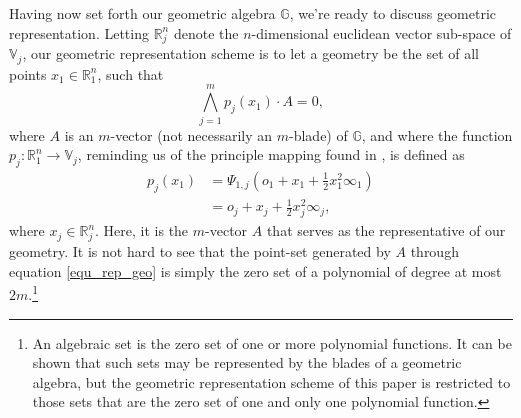 \documentclass{ecgd-l}
\theoremstyle{definition}
\theoremstyle{remark}
\numberwithin{equation}{section}
\newcommand{\G}{\mathbb{G}}
\newcommand{\V}{\mathbb{V}}
\newcommand{\R}{\mathbb{R}}
\newcommand{\nvai}{\infty}
\newcommand{\nvao}{o}
\begin{document}
Having now set forth our geometric algebra $\G$, we're ready to discuss
geometric representation.
Letting $\R^n_j$ denote the $n$-dimensional euclidean vector sub-space
of $\V_j$, our geometric representation scheme is to let a geometry be the
set of all points $x_1\in\R^n_1$, such that
\begin{equation}\label{equ_rep_geo}
\bigwedge_{j=1}^m p_j(x_1)\cdot A=0,
\end{equation}
where $A$ is an $m$-vector (not necessarily an $m$-blade) of $\G$, and
where the function $p_j:\R^n_1\to\V_j$, reminding us of the principle  mapping found in \cite{Hestenes01}, is defined as
\begin{align*}
p_j(x_1)&=\Psi_{1,j}\left(\nvao_1+x_1+\frac{1}{2}x_1^2\nvai_1\right) \\
 &= \nvao_j + x_j + \frac{1}{2}x_j^2\nvai_j,
\end{align*}
where $x_j\in\R^n_j$.
Here, it is the $m$-vector $A$ that serves as the representative of our geometry.
It is not hard to see that the point-set generated by $A$ through equation \eqref{equ_rep_geo}
is simply the zero set of a polynomial of degree at most $2m$.\footnote{An algebraic
set is the zero set of one or more polynomial functions.  It can be shown that such sets may be represented by
the blades of a geometric algebra, but the geometric representation scheme of this paper is restricted to those sets
that are the zero set of one and only one polynomial function.}
\end{document}
